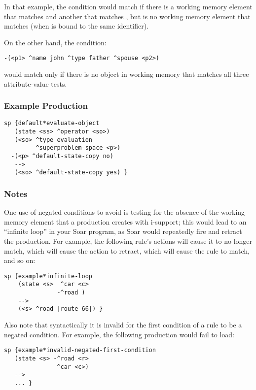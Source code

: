 In that example, the condition would match if there is a working memory element that matches  and another that matches , but is no working memory element that matches  (when  is bound to the same identifier).

On the other hand, the condition:

\begin{verbatim}
-(<p1> ^name john ^type father ^spouse <p2>)
\end{verbatim}

would match only if there is no object in working memory that matches all three attribute-value tests.

\subsubsection*{Example Production}

\begin{verbatim}
sp {default*evaluate-object
   (state <ss> ^operator <so>)
   (<so> ^type evaluation 
         ^superproblem-space <p>)
  -(<p> ^default-state-copy no)
   -->
   (<so> ^default-state-copy yes) }
\end{verbatim}

\subsubsection*{Notes}

One use of negated conditions to avoid is testing for the absence of the working memory element that a production creates with i-support; this would lead to an ``infinite loop'' in your Soar program, as Soar would repeatedly fire and retract the production. For example, the following rule's actions will cause it to no longer match, which will cause the action to retract, which will cause the rule to match, and so on:

\begin{verbatim}
sp {example*infinite-loop
    (state <s>  ^car <c>
               -^road )
    -->
    (<s> ^road |route-66|) }
\end{verbatim}

Also note that syntactically it is invalid for the first condition of a rule to be a negated condition. For example, the following production would fail to load:

\begin{verbatim}
sp {example*invalid-negated-first-condition
   (state <s> -^road <r>
               ^car <c>)
   -->
   ... }
\end{verbatim}


